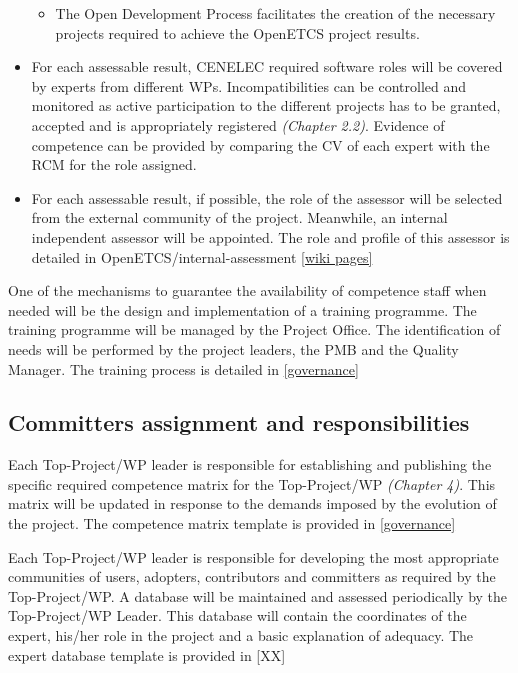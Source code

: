 \documentclass{template/openetcs_article}
\begin{document}
\begin{itemize}
\begin{itemize}
\item The Open Development Process facilitates the creation of the necessary projects required to achieve the OpenETCS project results.
\end{itemize}
\item For each assessable result, CENELEC required software roles will be covered by experts from different WPs. Incompatibilities can be controlled and monitored as active participation to the different projects has to be granted, accepted and is appropriately registered  \textit{(Chapter 2.2)}. Evidence of competence can be provided by comparing the CV of each expert with the RCM for the role assigned.
\item For each assessable result, if possible, the role of the \gls{assessor} will be selected from the external community of the project. Meanwhile, an internal independent \gls{assessor} will be appointed. The role and profile of this \gls{assessor} is detailed in OpenETCS/internal-assessment \citep{IA} \href{https://github.com/openETCS/ecosystem/wiki/WP4:-internal-assessment}{[wiki pages]}
\end{itemize}

One of the mechanisms to guarantee the availability of competence staff when needed will be the design and implementation of a training programme. The training programme will be managed by the Project Office. The identification of needs will be performed by the project leaders, the PMB and the Quality Manager. 
The training process is detailed in \href{https://github.com/openETCS/governance/tree/master/Training%20Process}{[governance]}


\subsection{Committers assignment and responsibilities}

Each Top-Project/\gls{WP} leader is responsible for establishing and publishing the specific required competence matrix for the Top-Project/\gls{WP} \textit{(Chapter 4)}. This matrix will be updated in response to the demands imposed by the evolution of the project. The competence matrix template \citep{Competence}is provided in \href{https://github.com/openETCS/governance/tree/master/Templates}{[governance]}

Each Top-Project/\gls{WP} leader is responsible for developing the most appropriate communities of users, adopters, contributors and committers as required by the Top-Project/\gls{WP}. A database will be maintained and assessed periodically by the Top-Project/\gls{WP} Leader. This database will contain the coordinates of the expert, his/her role in the project and a basic explanation of adequacy. The expert database template is provided in [XX]
\end{document}
